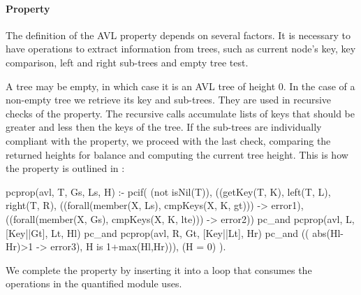 




\paragraph{\bf Property}


The definition of the AVL property depends on several factors.
%
It is necessary to have operations to extract information from trees,
such as current node's key, key comparison, left and
right sub-trees and empty tree test.


A tree may be empty, in which case it is an AVL tree of height 0.
%
In the case of a non-empty tree we retrieve its key and sub-trees.
%
They are used in recursive checks of the property.
%
The recursive calls accumulate lists of keys that should be greater and
less then the keys of the tree.
%
If the sub-trees are individually compliant with the property, we
proceed with the last check, comparing the returned heights for
balance and computing the current tree height.
%
This is how the property is outlined in \plqc{}:
%

\begin{yapcode}
pcprop({avl, T, Gs, Ls, H}) :- pcif( (not isNil(T)),
 ((getKey(T, K), left(T, L),  right(T, R),
      ((forall(member(X, Ls), cmpKeys(X, K, gt))) -> error1),
      ((forall(member(X, Gs), cmpKeys(X, K, lte))) -> error2))
   pc_and pcprop({avl, L, [Key||Gt], Lt, Hl})
   pc_and pcprop({avl, R, Gt, [Key||Lt], Hr})
   pc_and (( abs(Hl-Hr)>1 -> error3), H is 1+max(Hl,Hr))),
 (H = 0) ).
\end{yapcode}
%
We complete the property by inserting it into a loop that consumes the
operations in the quantified module uses.



